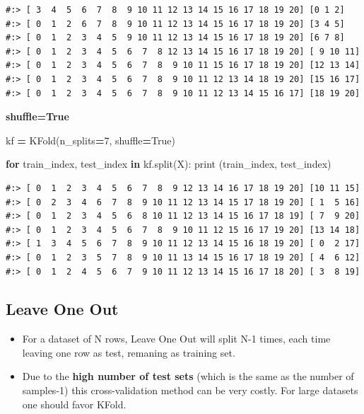 \documentclass[
]{book}
\newenvironment{Shaded}{\begin{snugshade}}{\end{snugshade}}
\newcommand{\BuiltInTok}[1]{#1}
\newcommand{\ControlFlowTok}[1]{\textcolor[rgb]{0.27,0.27,0.27}{\textbf{#1}}}
\newcommand{\DecValTok}[1]{\textcolor[rgb]{0.06,0.06,0.06}{#1}}
\newcommand{\KeywordTok}[1]{\textcolor[rgb]{0.27,0.27,0.27}{\textbf{#1}}}
\newcommand{\NormalTok}[1]{#1}
\newcommand{\OperatorTok}[1]{\textcolor[rgb]{0.43,0.43,0.43}{\textbf{#1}}}
\newcommand{\VariableTok}[1]{\textcolor[rgb]{0,0,0}{#1}}
\providecommand{\tightlist}{%
  \setlength{\itemsep}{0pt}\setlength{\parskip}{0pt}}
\begin{document}
\begin{verbatim}
#:> [ 3  4  5  6  7  8  9 10 11 12 13 14 15 16 17 18 19 20] [0 1 2]
#:> [ 0  1  2  6  7  8  9 10 11 12 13 14 15 16 17 18 19 20] [3 4 5]
#:> [ 0  1  2  3  4  5  9 10 11 12 13 14 15 16 17 18 19 20] [6 7 8]
#:> [ 0  1  2  3  4  5  6  7  8 12 13 14 15 16 17 18 19 20] [ 9 10 11]
#:> [ 0  1  2  3  4  5  6  7  8  9 10 11 15 16 17 18 19 20] [12 13 14]
#:> [ 0  1  2  3  4  5  6  7  8  9 10 11 12 13 14 18 19 20] [15 16 17]
#:> [ 0  1  2  3  4  5  6  7  8  9 10 11 12 13 14 15 16 17] [18 19 20]
\end{verbatim}

\textbf{shuffle=True}

\begin{Shaded}
\begin{Highlighting}[]
\NormalTok{kf }\OperatorTok{=}\NormalTok{ KFold(n_splits}\OperatorTok{=}\DecValTok{7}\NormalTok{, shuffle}\OperatorTok{=}\VariableTok{True}\NormalTok{)}
\end{Highlighting}
\end{Shaded}

\begin{Shaded}
\begin{Highlighting}[]
\ControlFlowTok{for}\NormalTok{ train_index, test_index }\KeywordTok{in}\NormalTok{ kf.split(X):}
  \BuiltInTok{print}\NormalTok{ (train_index, test_index)}
\end{Highlighting}
\end{Shaded}

\begin{verbatim}
#:> [ 0  1  2  3  4  5  6  7  8  9 12 13 14 16 17 18 19 20] [10 11 15]
#:> [ 0  2  3  4  6  7  8  9 10 11 12 13 14 15 17 18 19 20] [ 1  5 16]
#:> [ 0  1  2  3  4  5  6  8 10 11 12 13 14 15 16 17 18 19] [ 7  9 20]
#:> [ 0  1  2  3  4  5  6  7  8  9 10 11 12 15 16 17 19 20] [13 14 18]
#:> [ 1  3  4  5  6  7  8  9 10 11 12 13 14 15 16 18 19 20] [ 0  2 17]
#:> [ 0  1  2  3  5  7  8  9 10 11 13 14 15 16 17 18 19 20] [ 4  6 12]
#:> [ 0  1  2  4  5  6  7  9 10 11 12 13 14 15 16 17 18 20] [ 3  8 19]
\end{verbatim}

\hypertarget{leave-one-out}{%
\subsection{Leave One Out}\label{leave-one-out}}

\begin{itemize}
\tightlist
\item
  For a dataset of N rows, Leave One Out will split N-1 times, each time leaving one row as test, remaning as training set.\\
\item
  Due to the \textbf{high number of test sets} (which is the same as the number of samples-1) this cross-validation method can be very costly. For large datasets one should favor KFold.
\end{itemize}
\end{document}
